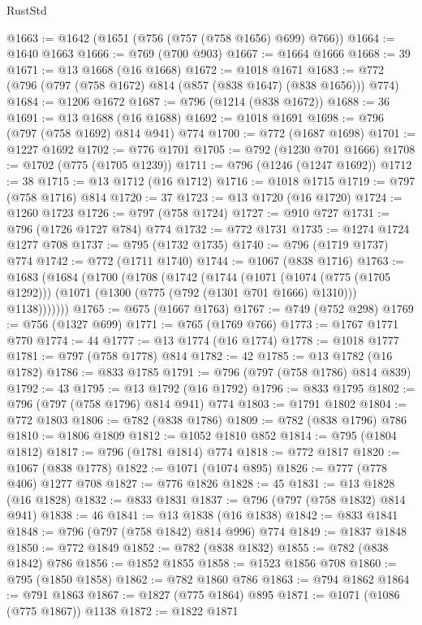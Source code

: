 \begin{lexlean}{RustStd}
\begin{coremodule}
{\begin{coremodule}
{{{{{{{{{{{{{{@1663 := @1642 (@1651 (@756 (@757 (@758 @1656) @699) @766))
@1664 := @1640 @1663
@1666 := @769 (@700 @903)
@1667 := @1664 @1666
@1668 := 39
@1671 := @13 @1668 (@16 @1668)
@1672 := @1018 @1671
@1683 := @772 (@796 (@797 (@758 @1672) @814 (@857 (@838 @1647) (@838 @1656))) @774)
@1684 := @1206 @1672
@1687 := @796 (@1214 (@838 @1672))
@1688 := 36
@1691 := @13 @1688 (@16 @1688)
@1692 := @1018 @1691
@1698 := @796 (@797 (@758 @1692) @814 @941) @774
@1700 := @772 (@1687 @1698)
@1701 := @1227 @1692
@1702 := @776 @1701
@1705 := @792 (@1230 @701 @1666)
@1708 := @1702 (@775 (@1705 @1239))
@1711 := @796 (@1246 (@1247 @1692))
@1712 := 38
@1715 := @13 @1712 (@16 @1712)
@1716 := @1018 @1715
@1719 := @797 (@758 @1716) @814
@1720 := 37
@1723 := @13 @1720 (@16 @1720)
@1724 := @1260 @1723
@1726 := @797 (@758 @1724)
@1727 := @910 @727
@1731 := @796 (@1726 @1727 @784) @774
@1732 := @772 @1731
@1735 := @1274 @1724 @1277 @708
@1737 := @795 (@1732 @1735)
@1740 := @796 (@1719 @1737) @774
@1742 := @772 (@1711 @1740)
@1744 := @1067 (@838 @1716)
@1763 := @1683
    (@1684
      (@1700
        (@1708
          (@1742
            (@1744
              (@1071
                (@1074 (@775 (@1705 @1292)))
                (@1071 (@1300 (@775 (@792 (@1301 @701 @1666) @1310))) @1138)))))))
@1765 := @675 (@1667 @1763)
@1767 := @749 (@752 @298)
@1769 := @756 (@1327 @699)
@1771 := @765 (@1769 @766)
@1773 := @1767 @1771 @770
@1774 := 44
@1777 := @13 @1774 (@16 @1774)
@1778 := @1018 @1777
@1781 := @797 (@758 @1778) @814
@1782 := 42
@1785 := @13 @1782 (@16 @1782)
@1786 := @833 @1785
@1791 := @796 (@797 (@758 @1786) @814 @839)
@1792 := 43
@1795 := @13 @1792 (@16 @1792)
@1796 := @833 @1795
@1802 := @796 (@797 (@758 @1796) @814 @941) @774
@1803 := @1791 @1802
@1804 := @772 @1803
@1806 := @782 (@838 @1786)
@1809 := @782 (@838 @1796) @786
@1810 := @1806 @1809
@1812 := @1052 @1810 @852
@1814 := @795 (@1804 @1812)
@1817 := @796 (@1781 @1814) @774
@1818 := @772 @1817
@1820 := @1067 (@838 @1778)
@1822 := @1071 (@1074 @895)
@1826 := @777 (@778 @406) @1277 @708
@1827 := @776 @1826
@1828 := 45
@1831 := @13 @1828 (@16 @1828)
@1832 := @833 @1831
@1837 := @796 (@797 (@758 @1832) @814 @941)
@1838 := 46
@1841 := @13 @1838 (@16 @1838)
@1842 := @833 @1841
@1848 := @796 (@797 (@758 @1842) @814 @996) @774
@1849 := @1837 @1848
@1850 := @772 @1849
@1852 := @782 (@838 @1832)
@1855 := @782 (@838 @1842) @786
@1856 := @1852 @1855
@1858 := @1523 @1856 @708
@1860 := @795 (@1850 @1858)
@1862 := @782 @1860 @786
@1863 := @794 @1862
@1864 := @791 @1863
@1867 := @1827 (@775 @1864) @895
@1871 := @1071 (@1086 (@775 @1867)) @1138
@1872 := @1822 @1871
}}}}}}}}}}}}}}
\end{coremodule}}
\end{coremodule}
\end{lexlean}

